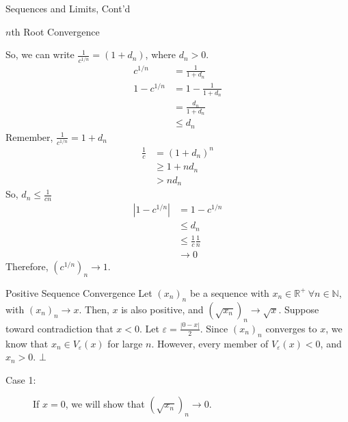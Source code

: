 \documentclass[8pt]{extarticle}
\newcommand{\N}{\mathbb{N}}
\newcommand{\R}{\mathbb{R}}
\begin{document}
\begin{problem}{Sequences and Limits, Cont'd}
\begin{problem}{$n$th Root Convergence}
\begin{description}
          So, we can write $\frac{1}{c^{1/n}} = (1 + d_n)$, where $d_n > 0$.
          \begin{align*}
            c^{1/n}&=\frac{1}{1 + d_n}\\
            1-c^{1/n} &= 1-\frac{1}{1+d_n}\\
                      &= \frac{d_n}{1+d_n}\\
                      &\leq d_n
          \end{align*}
          Remember, $\frac{1}{c^{1/n}} = 1 + d_n$
          \begin{align*}
            \frac{1}{c} &= (1+d_n)^n\\
                        &\geq 1 + nd_n\\
                        &> nd_n
          \end{align*}
          So, $d_n \leq \frac{1}{cn}$
          \begin{align*}
            |1-c^{1/n}| &= 1-c^{1/n}\\
                        &\leq d_n\\
                        &\leq \frac{1}{c}\frac{1}{n}\\
                        &\rightarrow 0
          \end{align*}
          Therefore, $\left(c^{1/n}\right)_n \rightarrow 1$.
      \end{description}
    \end{problem}
    \begin{problem}{Positive Sequence Convergence}
      Let $(x_n)_n$ be a sequence with $x_n\in\R^+~\forall n\in\N$, with $(x_n)_n \rightarrow x$. Then, $x$ is also positive, and $\left(\sqrt{x_n}\right)_n \rightarrow \sqrt{x}$.
      \tcblower
      Suppose toward contradiction that $x < 0$. Let $\varepsilon = \frac{|0-x|}{2}$. Since $(x_n)_n$ converges to $x$, we know that $x_n\in V_{\varepsilon}(x)$ for large $n$. However, every member of $V_{\varepsilon}(x) < 0$, and $x_n > 0$. $\bot$
      \begin{description}
        \item[Case 1:] If $x = 0$, we will show that $\left(\sqrt{x_n}\right)_n \rightarrow 0$.\newline


\end{description}
\end{problem}
\end{problem}
\end{document}
